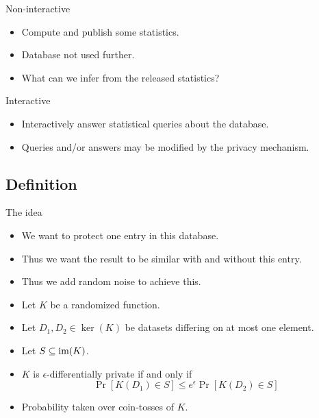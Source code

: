 \begin{frame}
  \begin{block}{Non-interactive}
    \begin{itemize}
      \item Compute and publish some statistics.
      \item Database not used further.
      \item What can we infer from the released statistics?
    \end{itemize}
  \end{block}

  \pause{}

  \begin{block}{Interactive}
    \begin{itemize}
      \item Interactively answer statistical queries about the database.
      \item Queries and/or answers may be modified by the privacy mechanism.
    \end{itemize}
  \end{block}
\end{frame}

\subsection{Definition}

\begin{frame}
  \begin{block}{The idea}
    \begin{itemize}
      \item We want to protect one entry in this database.

        \pause{}

      \item Thus we want the result to be similar with and without this entry.

        \pause{}

      \item Thus we add random noise to achieve this.
    \end{itemize}
  \end{block}
\end{frame}

\begin{frame}
  \begin{definition}
    \begin{itemize}
      \item Let \(K\) be a randomized function.
      \item Let \(D_1, D_2\in \ker(K)\) be datasets differing on at most one 
        element.
      \item Let \(S\subseteq \operatorname{im}(K)\).
      \item \(K\) is \(\epsilon\)-differentially private if and only if
        \[\Pr[K(D_1)\in S] \leq e^\epsilon \Pr[K(D_2)\in S]\]
      \item \color{red} Probability taken over coin-tosses of \(K\).
      \end{itemize}
  \end{definition}
\end{frame}

